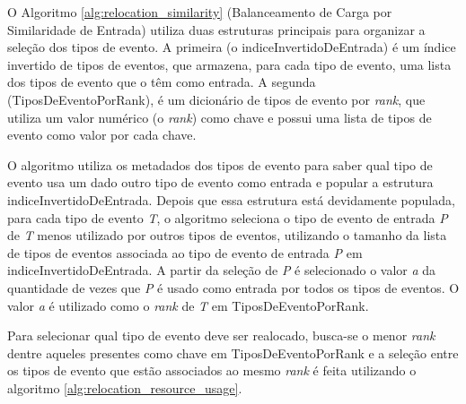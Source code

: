 O Algoritmo \ref{alg:relocation_similarity} (Balanceamento de Carga por Similaridade de Entrada) utiliza duas estruturas principais para organizar a seleção dos tipos de evento. A primeira (o indiceInvertidoDeEntrada) é um índice invertido de tipos de eventos, que armazena, para cada tipo de evento, uma lista dos tipos de evento que o têm como entrada. A segunda (TiposDeEventoPorRank), é um dicionário de tipos de evento por \textit{rank}, que utiliza um valor numérico (o \textit{rank}) como chave e possui uma lista de tipos de evento como valor por cada chave. 

O algoritmo utiliza os metadados dos tipos de evento para saber qual tipo de evento usa um dado outro tipo de evento como entrada e popular a estrutura indiceInvertidoDeEntrada. Depois que essa estrutura está devidamente populada, para cada tipo de evento \textit{T}, o algoritmo seleciona o tipo de evento de entrada \textit{P} de \textit{T} menos utilizado por outros tipos de eventos, utilizando o tamanho da lista de tipos de eventos associada ao tipo de evento de entrada \textit{P} em indiceInvertidoDeEntrada. A partir da seleção de \textit{P} é selecionado o valor \textit{a} da quantidade de vezes que \textit{P} é usado como entrada por todos os tipos de eventos. O valor \textit{a} é utilizado como o \textit{rank} de \textit{T} em TiposDeEventoPorRank.%

Para selecionar qual tipo de evento deve ser realocado, busca-se o menor \textit{rank} dentre aqueles presentes como chave em TiposDeEventoPorRank e a seleção entre os tipos de evento que estão associados ao mesmo \textit{rank} é feita utilizando o algoritmo \ref{alg:relocation_resource_usage}.



